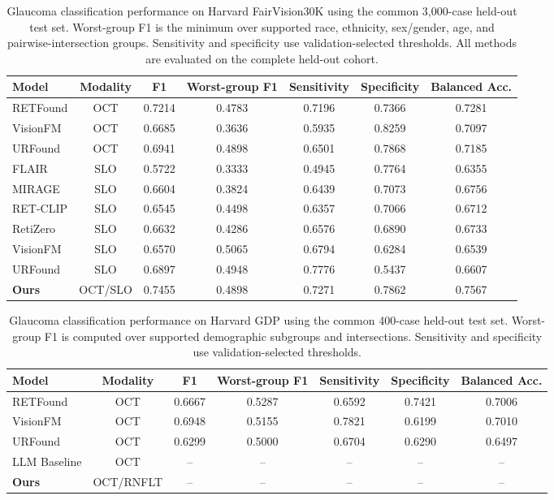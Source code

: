 \begin{table}[t]
\centering
\caption{Glaucoma classification performance on Harvard FairVision30K using
the common 3,000-case held-out test set. Worst-group F1 is the minimum over
supported race, ethnicity, sex/gender, age, and pairwise-intersection groups.
Sensitivity and specificity use validation-selected thresholds. All methods
are evaluated on the complete held-out cohort.}
\label{tab:glaucoma_fairvision30k}
\begin{tabular}{lcccccc}
\toprule
\textbf{Model} & \textbf{Modality} & \textbf{F1} & \textbf{Worst-group F1} & \textbf{Sensitivity} & \textbf{Specificity} & \textbf{Balanced Acc.} \\
\midrule
RETFound & OCT & 0.7214 & 0.4783 & 0.7196 & 0.7366 & 0.7281 \\
VisionFM & OCT & 0.6685 & 0.3636 & 0.5935 & 0.8259 & 0.7097 \\
URFound & OCT & 0.6941 & 0.4898 & 0.6501 & 0.7868 & 0.7185 \\
FLAIR & SLO & 0.5722 & 0.3333 & 0.4945 & 0.7764 & 0.6355 \\
MIRAGE & SLO & 0.6604 & 0.3824 & 0.6439 & 0.7073 & 0.6756 \\
RET-CLIP & SLO & 0.6545 & 0.4498 & 0.6357 & 0.7066 & 0.6712 \\
RetiZero & SLO & 0.6632 & 0.4286 & 0.6576 & 0.6890 & 0.6733 \\
VisionFM & SLO & 0.6570 & 0.5065 & 0.6794 & 0.6284 & 0.6539 \\
URFound & SLO & 0.6897 & 0.4948 & 0.7776 & 0.5437 & 0.6607 \\
\textbf{Ours} & OCT/SLO & 0.7455 & 0.4898 & 0.7271 & 0.7862 & 0.7567 \\
\bottomrule
\end{tabular}
\end{table}

\begin{table}[t]
\centering
\caption{Glaucoma classification performance on Harvard GDP using the common
400-case held-out test set. Worst-group F1 is computed over supported
demographic subgroups and intersections. Sensitivity and specificity use
validation-selected thresholds.}
\label{tab:glaucoma_gdp}
\begin{tabular}{lcccccc}
\toprule
\textbf{Model} & \textbf{Modality} & \textbf{F1} & \textbf{Worst-group F1} & \textbf{Sensitivity} & \textbf{Specificity} & \textbf{Balanced Acc.} \\
\midrule
RETFound & OCT & 0.6667 & 0.5287 & 0.6592 & 0.7421 & 0.7006 \\
VisionFM & OCT & 0.6948 & 0.5155 & 0.7821 & 0.6199 & 0.7010 \\
URFound & OCT & 0.6299 & 0.5000 & 0.6704 & 0.6290 & 0.6497 \\
LLM Baseline & OCT & -- & -- & -- & -- & -- \\
\textbf{Ours} & OCT/RNFLT & -- & -- & -- & -- & -- \\
\bottomrule
\end{tabular}
\end{table}

